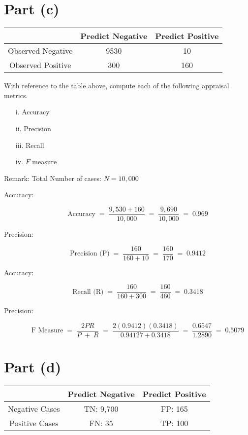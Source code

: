 \documentclass[a4paper,12pt]{article}
\begin{document}
	\section*{Part (c)}	
	\begin{center}
		\begin{tabular}{|c|c|c|}
			\hline  & \phantom{spa}Predict Negative\phantom{spa} & \phantom{spa}Predict Positive\phantom{spa} \\ 
			\hline \phantom{spa}Observed Negative\phantom{spa} &	9530	&	10	\\ 
			\hline \phantom{spa}Observed Positive\phantom{spa} & 	300	&	160	\\ 
			\hline 
		\end{tabular} 
	\end{center}

\medskip 
\begin{framed}
\noindent With reference to the table above, compute each of the following appraisal metrics.
\begin{multicols}{2} 
	\begin{itemize}
		\item [i.] Accuracy
		\item [ii.] Precision
		\item [iii.] Recall
		\item [iv.] $F$ measure
	\end{itemize}
\end{multicols}
\end{framed}
\medskip 


\noindent Remark: Total Number of cases: $N=10,000$
\begin{description}
\item[Accuracy:]

\[ \mbox{Accuracy} \;=\;\frac{9,530 + 160}{10,000}  \;=\;\frac{9,690}{10,000} \;=\;0.969 \] 
\item[Precision:]

\[ \mbox{Precision (P)} \;=\;\frac{160}{160+10}  \;=\;\frac{160}{170} \;=\;0.9412 \] 
\item[Accuracy:]

\[ \mbox{Recall (R)} \;=\;\frac{160}{160+300}  \;=\;\frac{160}{460} \;=\;0.3418 \] 
\item[Precision:]

\[ \mbox{F Measure} \;=\;\frac{2PR}{P\;+\;R}  \;=\;\frac{2(0.9412)(0.3418)}{ 0.94127 + 0.3418} \;=\;\frac{0.6547}{1.2890} \;=\;0.5079 \] 
\end{description}
\newpage 

	\section*{Part (d)}	
\begin{center}
	\begin{tabular}{|c|c|c|}
			\hline  & \phantom{spa}Predict Negative\phantom{spa} & \phantom{spa}Predict Positive\phantom{spa}  \\ \hline
		Negative Cases & TN: 9,700  & FP: 165 \\ \hline
		Positive Cases & FN: 35 & TP: 100 \\ \hline
	\end{tabular} 
\end{center}
\end{document}
